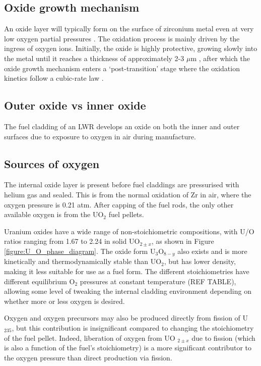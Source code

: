 \subsection{Oxide growth mechanism}

An oxide layer will typically form on the surface of zirconium metal even at very low oxygen partial pressures \cite{causey2005review}. The oxidation process is mainly driven by the ingress of oxygen ions. Initially, the oxide is highly protective, growing slowly into the metal until it reaches a thickness of approximately 2-3 $\mu$m \cite{garzarolli1991oxide,dawson1968kinetics}, after which the oxide growth mechanism enters a `post-transition' stage where the oxidation kinetics follow a cubic-rate law  \cite{porte1960oxidation}.

\subsection{Outer oxide vs inner oxide}
The fuel cladding of an LWR develops an oxide on both the inner and outer surfaces due to exposure to oxygen in air during manufacture. 

\subsection{Sources of oxygen}

The internal oxide layer is present before fuel claddings are pressurised with helium gas and sealed. This is from the normal oxidation of Zr in air, where the oxygen pressure is 0.21 atm. After capping of the fuel rods, the only other available oxygen is from the UO$_{2}$ fuel pellets.

Uranium oxides have a wide range of non-stoichiometric compositions, with U/O ratios ranging from 1.67 to 2.24 in solid UO$_{2 \pm x}$, as shown in Figure \ref{figure:U_O_phase_diagram}. The oxide form U$_{3}$O$_{8-y}$ also exists and is more kinetically and thermodynamically stable than UO$_{2}$, but has lower density, making it less suitable for use as a fuel form. The different stoichiometries have different equilibrium O$_{2}$ pressures at constant temperature (REF TABLE), allowing some level of tweaking the internal cladding environment depending on whether more or less oxygen is desired. 

Oxygen and oxygen precursors may also be produced directly from fission of U
$_{235}$, but this contribution is insignificant compared to changing the stoichiometry of the fuel pellet. Indeed, liberation of oxygen from UO
$_{2 \pm x}$ due to fission (which is also a function of the fuel's stoichiometry) is a more significant contributor to the oxygen pressure than direct production via fission.

